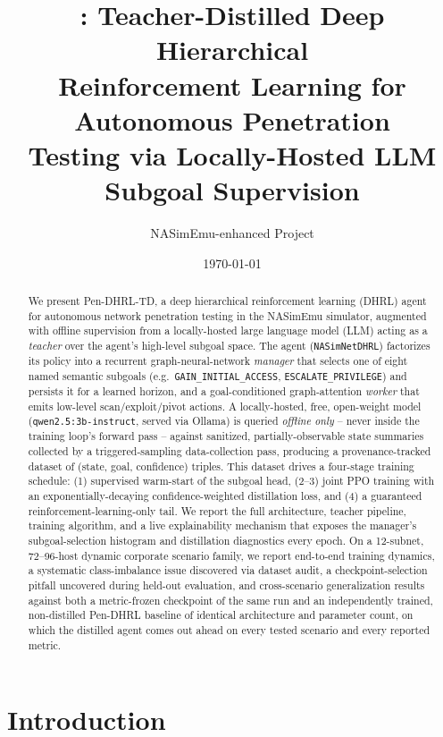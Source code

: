 \documentclass[11pt]{article}
\title{\pendhrl{}: Teacher-Distilled Deep Hierarchical\\
Reinforcement Learning for Autonomous Penetration\\
Testing via Locally-Hosted LLM Subgoal Supervision}
\author{NASimEmu-enhanced Project}
\date{\today}
\newcommand{\pendhrl}{Pen-DHRL-TD}
\newcommand{\code}[1]{\texttt{#1}}
\begin{document}
\maketitle

\begin{abstract}
We present \pendhrl{}, a deep hierarchical reinforcement learning (DHRL) agent for
autonomous network penetration testing in the NASimEmu simulator, augmented with
offline supervision from a locally-hosted large language model (LLM) acting as a
\emph{teacher} over the agent's high-level subgoal space. The agent (\code{NASimNetDHRL})
factorizes its policy into a recurrent graph-neural-network \emph{manager} that
selects one of eight named semantic subgoals (e.g.\ \code{GAIN\_INITIAL\_ACCESS},
\code{ESCALATE\_PRIVILEGE}) and persists it for a learned horizon, and a
goal-conditioned graph-attention \emph{worker} that emits low-level scan/exploit/pivot
actions. A locally-hosted, free, open-weight model (\code{qwen2.5:3b-instruct}, served
via Ollama) is queried \emph{offline only} -- never inside the training loop's forward
pass -- against sanitized, partially-observable state summaries collected by a
triggered-sampling data-collection pass, producing a provenance-tracked dataset of
(state, goal, confidence) triples. This dataset drives a four-stage training schedule:
(1) supervised warm-start of the subgoal head, (2--3) joint PPO training with an
exponentially-decaying confidence-weighted distillation loss, and (4) a
guaranteed reinforcement-learning-only tail. We report the full architecture,
teacher pipeline, training algorithm, and a live explainability mechanism that
exposes the manager's subgoal-selection histogram and distillation diagnostics every
epoch. On a 12-subnet, 72--96-host dynamic corporate scenario family, we report
end-to-end training dynamics, a systematic class-imbalance issue discovered via
dataset audit, a checkpoint-selection pitfall uncovered during held-out evaluation,
and cross-scenario generalization results against both a metric-frozen checkpoint of
the same run and an independently trained, non-distilled Pen-DHRL baseline of
identical architecture and parameter count, on which the distilled agent comes out
ahead on every tested scenario and every reported metric.
\end{abstract}

\tableofcontents
\newpage

\section{Introduction}
\end{document}
